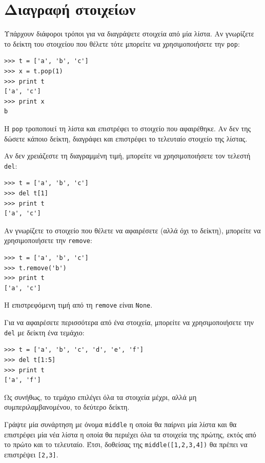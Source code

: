 \documentclass[10pt]{book}
\begin{document}
\section{Διαγραφή στοιχείων}

Υπάρχουν διάφοροι τρόποι για να διαγράψετε στοιχεία από μία λίστα. Αν γνωρίζετε το δείκτη του στοιχείου που θέλετε τότε μπορείτε να χρησιμοποιήσετε την {\tt pop}:

\begin{verbatim}
>>> t = ['a', 'b', 'c']
>>> x = t.pop(1)
>>> print t
['a', 'c']
>>> print x
b
\end{verbatim}
%

Η {\tt pop} τροποποιεί τη λίστα και επιστρέφει το στοιχείο που αφαιρέθηκε.
Αν δεν της δώσετε κάποιο δείκτη, διαγράφει και επιστρέφει το τελευταίο στοιχείο της λίστας.

Αν δεν χρειάζεστε τη διαγραμμένη τιμή, μπορείτε να χρησιμοποιήσετε τον τελεστή {\tt del}:

\begin{verbatim}
>>> t = ['a', 'b', 'c']
>>> del t[1]
>>> print t
['a', 'c']
\end{verbatim}
%

Αν γνωρίζετε το στοιχείο που θέλετε να αφαιρέσετε (αλλά όχι το δείκτη), μπορείτε να χρησιμοποιήσετε την {\tt remove}:

\begin{verbatim}
>>> t = ['a', 'b', 'c']
>>> t.remove('b')
>>> print t
['a', 'c']
\end{verbatim}
%

Η επιστρεφόμενη τιμή από τη {\tt remove} είναι {\tt None}.

Για να αφαιρέσετε περισσότερα από ένα στοιχεία, μπορείτε να χρησιμοποιήσετε την  {\tt del} με δείκτη ένα τεμάχιο:

\begin{verbatim}
>>> t = ['a', 'b', 'c', 'd', 'e', 'f']
>>> del t[1:5]
>>> print t
['a', 'f']
\end{verbatim}
%

Ως συνήθως, το τεμάχιο επιλέγει όλα τα στοιχεία μέχρι, αλλά μη συμπεριλαμβανομένου, το δεύτερο δείκτη.
\\
\begin{exercise}

Γράψτε μία συνάρτηση με όνομα \verb"middle" η οποία θα παίρνει μία λίστα και θα επιστρέφει μία νέα λίστα η οποία θα περιέχει όλα τα στοιχεία της πρώτης, εκτός από το πρώτο και το τελευταίο. Έτσι, δοθείσας της \verb"middle([1,2,3,4])" θα πρέπει να επιστρέψει \verb"[2,3]".
\\
\end{exercise}
\end{document}
